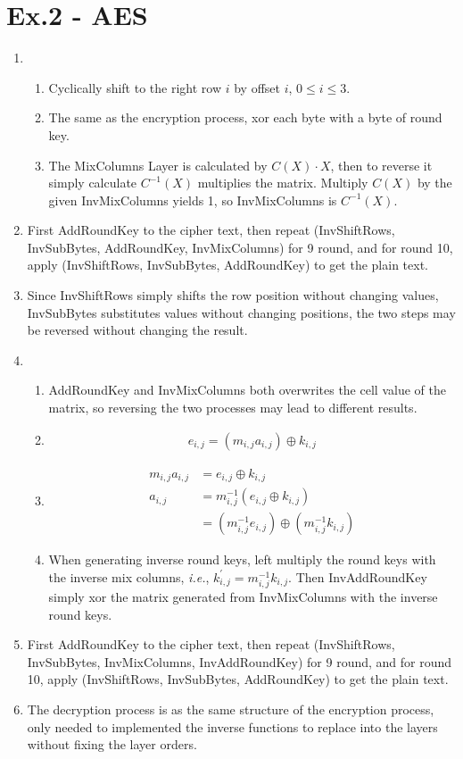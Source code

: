\documentclass[12pt]{article}
\begin{document}
\section*{Ex.2 - AES}

\begin{enumerate}
	\item
		\begin{enumerate}
			\item
				Cyclically shift to the right row $i$ by offset $i$, $0 \le i \le 3$.
			\item
				The same as the encryption process, xor each byte with a byte of round key.
			\item
				The MixColumns Layer is calculated by $C(X) \cdot X$, then to reverse it simply calculate $C^{-1}(X)$ multiplies the matrix. Multiply $C(X)$ by the given InvMixColumns yields 1, so InvMixColumns is $C^{-1}(X)$.
		\end{enumerate}
	\item
		First AddRoundKey to the cipher text, then repeat (InvShiftRows, InvSubBytes, AddRoundKey, InvMixColumns) for 9 round, and for round 10, apply (InvShiftRows, InvSubBytes, AddRoundKey) to get the plain text.
	\item
		Since InvShiftRows simply shifts the row position without changing values, InvSubBytes substitutes values without changing positions, the two steps may be reversed without changing the result.
	\item
		\begin{enumerate}
			\item
				AddRoundKey and InvMixColumns both overwrites the cell value of the matrix, so reversing the two processes may lead to different results.
			\item
				\begin{align*}
					e_{i,j}=(m_{i,j}a_{i,j})\oplus k_{i,j}
				\end{align*}
			\item
				\begin{align*}
					m_{i,j}a_{i,j}&=e_{i,j}\oplus k_{i,j}\\
					a_{i,j}&=m_{i,j}^{-1}(e_{i,j}\oplus k_{i,j})\\
					&=(m_{i,j}^{-1}e_{i,j})\oplus(m_{i,j}^{-1}k_{i,j})
				\end{align*}
			\item
				When generating inverse round keys, left multiply the round keys with the inverse mix columns, \textit{i.e.}, $k^{'}_{i,j}=m_{i,j}^{-1}k_{i,j}$. Then InvAddRoundKey simply xor the matrix generated from InvMixColumns with the inverse round keys.
		\end{enumerate}
	\item
		First AddRoundKey to the cipher text, then repeat (InvShiftRows, InvSubBytes, InvMixColumns, InvAddRoundKey) for 9 round, and for round 10, apply (InvShiftRows, InvSubBytes, AddRoundKey) to get the plain text.
	\item
		The decryption process is as the same structure of the encryption process, only needed to implemented the inverse functions to replace into the layers without fixing the layer orders.
\end{enumerate}
\end{document}
